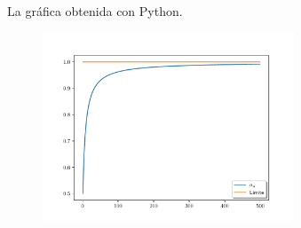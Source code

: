 \begin{frame}[fragile]
    La gráfica obtenida con Python.

    \begin{minipage}{0.5\textwidth}
        \begin{figure}[ht!]
            \centering
            \includegraphics[width=7.5cm]{questions/p5}
        \end{figure}
    \end{minipage}
    \begin{minipage}{0.4\textwidth}
    \end{minipage}
\end{frame}

\begin{frame}[fragile]
    \begin{solution}
        \begin{columns}
            \begin{column}{0.48\textwidth}
                \inputminted[fontsize=\tiny,firstline=3,lastline=6]{python}{questions/p5.py}

                \

                \inputminted[fontsize=\tiny,firstline=8,lastline=12]{python}{questions/p5.py}

            \end{column}
            \begin{column}{0.48\textwidth}
                \inputminted[fontsize=\tiny,firstline=14,lastline=18]{python}{questions/p5.py}
            \end{column}
        \end{columns}
    \end{solution}
\end{frame}

